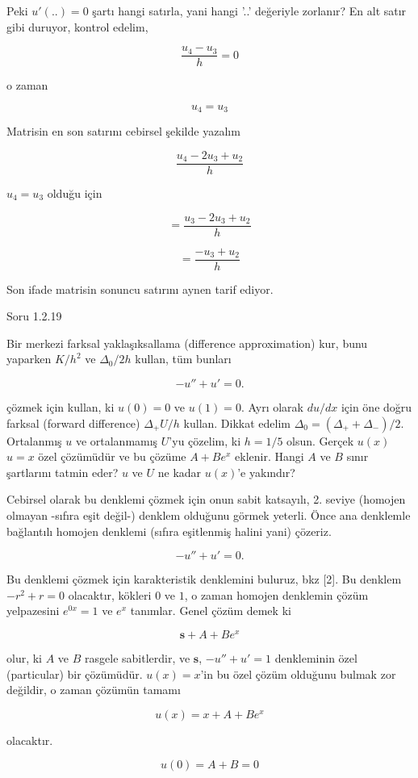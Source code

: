 \documentclass[12pt,fleqn]{article}\usepackage{../../common}
\begin{document}
Peki $u'(..) = 0$ şartı hangi satırla, yani hangi '..' değeriyle zorlanır?
En alt satır gibi duruyor, kontrol edelim, 

$$ \frac{u_4-u_3}{h} = 0$$

o zaman

$$ u_4 = u_3 $$

Matrisin en son satırını cebirsel şekilde yazalım

$$ \frac{u_4 - 2u_3 + u_2}{h} $$

$u_4 = u_3$ olduğu için

$$ = \frac{u_3 - 2u_3 + u_2}{h} $$

$$ = \frac{-u_3 + u_2}{h} $$

Son ifade matrisin sonuncu satırını aynen tarif ediyor.

Soru 1.2.19

Bir merkezi farksal yaklaşıksallama (difference approximation) kur, bunu
yaparken $K/h^2$ ve $\Delta_0 / 2h$ kullan, tüm bunları 

$$ -u'' + u' = 0. $$

çözmek için kullan, ki $u(0) = 0$ ve $u(1) = 0$. Ayrı olarak $du/dx$ için
öne doğru farksal (forward difference) $\Delta_{+}U/h$ kullan. Dikkat
edelim $\Delta_0 = (\Delta_{+} + \Delta_{-}) / 2$. Ortalanmış $u$ ve
ortalanmamış $U$'yu çözelim, ki $h = 1/5$ olsun. Gerçek $u(x)$ $u=x$ özel
çözümüdür ve bu çözüme $A+Be^x$ eklenir. Hangi $A$ ve $B$ sınır şartlarını
tatmin eder? $u$ ve $U$ ne kadar $u(x)$'e yakındır? 

Cebirsel olarak bu denklemi çözmek için onun sabit katsayılı, 2. seviye
(homojen olmayan -sıfıra eşit değil-) denklem olduğunu görmek yeterli. Önce
ana denklemle bağlantılı homojen denklemi (sıfıra eşitlenmiş halini yani)
çözeriz.

$$ -u'' + u' = 0. $$

Bu denklemi çözmek için karakteristik denklemini buluruz, bkz [2]. Bu
denklem $-r^2 + r = 0$ olacaktır, kökleri $0$ ve $1$, o zaman homojen
denklemin çözüm yelpazesini $e^{0x}=1$ ve $e^{x}$ tanımlar. Genel çözüm
demek ki

$$ \mathbf{s} + A + Be^x $$

olur, ki $A$ ve $B$ rasgele sabitlerdir, ve $\mathbf{s}$, $-u''+u'=1$ denkleminin
özel (particular) bir çözümüdür. $u(x)=x$'in bu özel çözüm olduğunu bulmak
zor değildir, o zaman çözümün tamamı

$$ u(x) = x + A + Be^x $$

olacaktır. 

$$ u(0) = A + B = 0 $$
\end{document}
